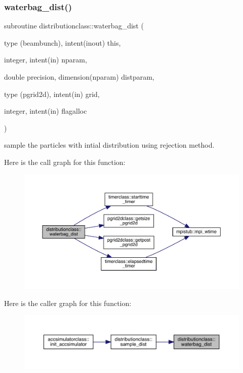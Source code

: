 \subsubsection{\texorpdfstring{waterbag\_dist()}{waterbag\_dist()}}
{\footnotesize\ttfamily subroutine distributionclass\+::waterbag\+\_\+dist (\begin{DoxyParamCaption}\item[{type (beambunch), intent(inout)}]{this,  }\item[{integer, intent(in)}]{nparam,  }\item[{double precision, dimension(nparam)}]{distparam,  }\item[{type (pgrid2d), intent(in)}]{grid,  }\item[{integer, intent(in)}]{flagalloc }\end{DoxyParamCaption})}



sample the particles with intial distribution using rejection method. 

Here is the call graph for this function\+:\nopagebreak
\begin{figure}[H]
\begin{center}
\leavevmode
\includegraphics[width=350pt]{namespacedistributionclass_aed734df6d00f7004cf11847adb42dd1d_cgraph}
\end{center}
\end{figure}
Here is the caller graph for this function\+:\nopagebreak
\begin{figure}[H]
\begin{center}
\leavevmode
\includegraphics[width=350pt]{namespacedistributionclass_aed734df6d00f7004cf11847adb42dd1d_icgraph}
\end{center}
\end{figure}
\mbox{\label{namespacedistributionclass_a50c29600de2efb52342fa5b2e2e21283}} 
